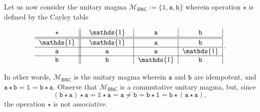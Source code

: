 \documentclass[10pt,reqno]{amsart}
\numberwithin{equation}{subsection}
\newcommand{\Mca}{\mathcal{M}}
\newcommand{\Att}{\mathtt{a}}
\newcommand{\Btt}{\mathtt{b}}
\newcommand{\BNC}{\mathsf{BNC}}
\newcommand{\Unit}{\mathds{1}}
\newcommand{\Op}{\star}
\begin{document}
Let us now consider the unitary magma
$\Mca_{\BNC} := \{\Unit, \Att, \Btt\}$ wherein operation $\Op$ is
defined by the Cayley table
\begin{small}
\begin{equation}
    \begin{tabular}{c||c|c|c|}
        $\Op$ & \; $\Unit$ \; & \; $\Att$ \; & \; $\Btt$ \; \\ \hline \hline
        $\Unit$ & $\Unit$ & $\Att$ & $\Btt$ \\ \hline
        $\Att$ & $\Att$ & $\Att$ & $\Unit$ \\ \hline
        $\Btt$ & $\Btt$ & $\Unit$ & $\Btt$
    \end{tabular}\, .
\end{equation}
\end{small}
In other words, $\Mca_{\BNC}$ is the unitary magma wherein $\Att$ and
$\Btt$ are idempotent, and $\Att \Op \Btt = \Unit = \Btt \Op \Att$.
Observe that $\Mca_{\BNC}$ is a commutative unitary magma, but, since
\begin{equation}
    (\Btt \Op \Att) \Op \Att = \Unit \Op \Att = \Att
    \ne
    \Btt = \Btt \Op \Unit = \Btt \Op (\Att \Op \Att),
\end{equation}
the operation $\Op$ is not associative.
\medskip
\end{document}
